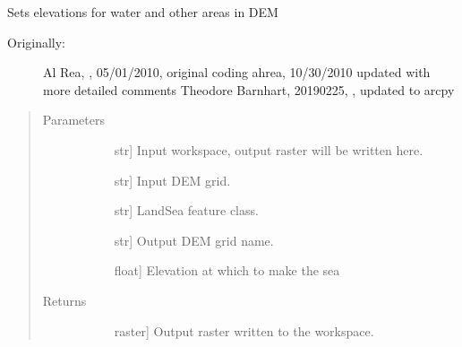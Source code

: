 \documentclass[letterpaper,10pt,english]{sphinxmanual}
\begin{document}

\begin{fulllineitems}
\label{\detokenize{make_hydrodem:make_hydrodem.coastaldem}}
Sets elevations for water and other areas in DEM
\begin{description}
\item[{Originally:}] \leavevmode
Al Rea, , 05/01/2010, original coding
ahrea, 10/30/2010 updated with more detailed comments
Theodore Barnhart, 20190225, , updated to arcpy

\end{description}
\begin{quote}\begin{description}
\item[{Parameters}] \leavevmode\begin{description}
\item[{}] \leavevmode{[}str{]}
Input workspace, output raster will be written here.

\item[{}] \leavevmode{[}str{]}
Input DEM grid.

\item[{}] \leavevmode{[}str{]}
LandSea feature class.

\item[{}] \leavevmode{[}str{]}
Output DEM grid name.

\item[{}] \leavevmode{[}float{]}
Elevation at which to make the sea

\end{description}

\item[{Returns}] \leavevmode\begin{description}
\item[{}] \leavevmode{[}raster{]}
Output raster written to the workspace.

\end{description}

\end{description}\end{quote}

\end{fulllineitems}
\end{document}
